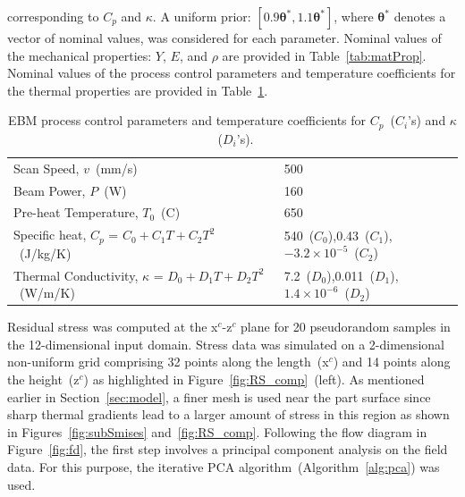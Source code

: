 corresponding to $C_p$ and $\kappa$. A uniform prior: $[0.9\bm{\theta}^\ast, 1.1\bm{\theta}^\ast]$, 
where $\bm{\theta}^\ast$ denotes a vector of nominal values,
was considered for each parameter. Nominal values of the mechanical properties: $Y$, $E$, and $\rho$ are provided
in Table~\ref{tab:matProp}. Nominal values of the process control parameters and temperature coefficients for
the thermal properties are provided in Table~\ref{tab:remain}.
%
\begin{table}[htbp]
\centering
\caption{EBM process control parameters and temperature coefficients for $C_p$~($C_i$'s) and $\kappa$~($D_i$'s).}
\label{tab:remain}
\vspace{1mm}
\begin{tabular}{ ll }
\toprule
Scan Speed, $v$~(mm/s) & 500 \\
Beam Power, $P$~(W) & 160 \\
Pre-heat Temperature, $T_0$~(C) & 650 \\
Specific heat, $C_p$ = $C_0+C_1T+C_2T^2$~(J/kg/K) & 540~($C_0$),0.43~($C_1$),$-3.2\times 10^{-5}$~($C_2$) \\
Thermal Conductivity, $\kappa$ = $D_0+D_1T+D_2T^2$~(W/m/K) & 7.2~($D_0$),0.011~($D_1$),$1.4\times 10^{-6}$~($D_2$) \\
\bottomrule
\end{tabular}
\end{table}

Residual stress was computed at the x$^c$-z$^c$ plane for 20 pseudorandom samples in the 12-dimensional
input domain. Stress data was simulated on a 2-dimensional non-uniform grid comprising 32 points along the
length~(x$^c$) and 14 points along the height~(z$^c$) as highlighted in Figure~\ref{fig:RS_comp}~(left).
As mentioned earlier in Section~\ref{sec:model}, a 
finer mesh is used near the part surface since sharp thermal gradients lead to a larger amount of stress
in this region as shown in Figures~\ref{fig:subSmises} and~\ref{fig:RS_comp}.  Following the flow diagram
in Figure~\ref{fig:fd}, the first step involves a principal component analysis on the field data. For this purpose,
the iterative PCA  algorithm~(Algorithm~\ref{alg:pca}) was used. 

